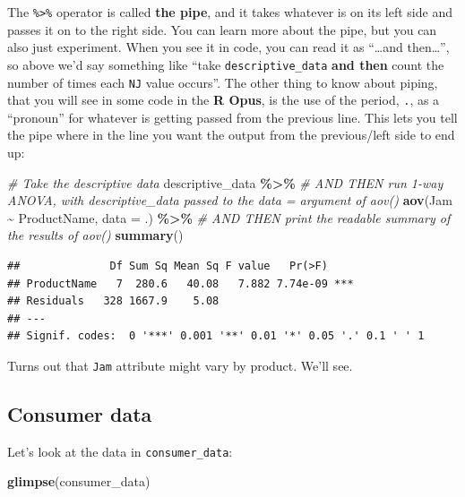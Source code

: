 \documentclass[
]{book}
\newenvironment{Shaded}{\begin{snugshade}}{\end{snugshade}}
\newcommand{\AttributeTok}[1]{\textcolor[rgb]{0.13,0.29,0.53}{#1}}
\newcommand{\CommentTok}[1]{\textcolor[rgb]{0.56,0.35,0.01}{\textit{#1}}}
\newcommand{\FunctionTok}[1]{\textcolor[rgb]{0.13,0.29,0.53}{\textbf{#1}}}
\newcommand{\NormalTok}[1]{#1}
\newcommand{\SpecialCharTok}[1]{\textcolor[rgb]{0.81,0.36,0.00}{\textbf{#1}}}
\begin{document}
The \texttt{\%\textgreater{}\%} operator is called \textbf{the pipe}, and it takes whatever is on its left side and passes it on to the right side. You can learn more about the pipe, but you can also just experiment. When you see it in code, you can read it as ``\ldots and then\ldots{}'', so above we'd say something like ``take \texttt{descriptive\_data} \textbf{and then} count the number of times each \texttt{NJ} value occurs''. The other thing to know about piping, that you will see in some code in the \textbf{R Opus}, is the use of the period, \texttt{.}, as a ``pronoun'' for whatever is getting passed from the previous line. This lets you tell the pipe where in the line you want the output from the previous/left side to end up:

\begin{Shaded}
\begin{Highlighting}[]
 \CommentTok{\# Take the descriptive data}
\NormalTok{descriptive\_data }\SpecialCharTok{\%\textgreater{}\%}
\CommentTok{\# AND THEN run 1{-}way ANOVA, with descriptive\_data passed to the \textasciigrave{}data =\textasciigrave{} argument of aov()}
  \FunctionTok{aov}\NormalTok{(Jam }\SpecialCharTok{\textasciitilde{}}\NormalTok{ ProductName, }\AttributeTok{data =}\NormalTok{ .) }\SpecialCharTok{\%\textgreater{}\%}
\CommentTok{\# AND THEN print the readable summary of the results of aov()}
  \FunctionTok{summary}\NormalTok{()}
\end{Highlighting}
\end{Shaded}

\begin{verbatim}
##              Df Sum Sq Mean Sq F value   Pr(>F)    
## ProductName   7  280.6   40.08   7.882 7.74e-09 ***
## Residuals   328 1667.9    5.08                     
## ---
## Signif. codes:  0 '***' 0.001 '**' 0.01 '*' 0.05 '.' 0.1 ' ' 1
\end{verbatim}

Turns out that \texttt{Jam} attribute might vary by product. We'll see.

\subsection{Consumer data}\label{consumer-data}

Let's look at the data in \texttt{consumer\_data}:

\begin{Shaded}
\begin{Highlighting}[]
\FunctionTok{glimpse}\NormalTok{(consumer\_data)}
\end{Highlighting}
\end{Shaded}
\end{document}

